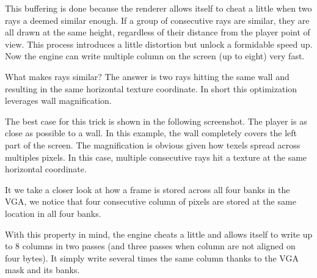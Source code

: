 \par
This buffering is done because the renderer allows itself to cheat a little when two rays a deemed similar enough. If a group of consecutive rays are similar, they are all drawn at the same height, regardless of their distance from the player point of view. This process introduces a little distortion but unlock a formidable speed up. Now the engine can write multiple column on the screen (up to eight) very fast.\\
\par
What makes rays similar? The answer is two rays hitting the same wall and resulting in the same  horizontal texture coordinate. In short this optimization leverages wall magnification.\\

\par
The best case for this trick is shown in the following screenshot. The player is as close as possible to a wall. In this example, the wall completely covers the left part of the screen. The magnification is obvious given how texels spread across multiples pixels. In this case, multiple consecutive rays hit a texture at the same horizontal coordinate.\\
\begin{figure}[H]
 \centering
\end{figure}
It we take a closer look at how a frame is stored across all four banks in the VGA, we notice that four consecutive column of pixels are stored at the same location in all four banks.\\
\par
With this property in mind, the engine cheats a little and allows itself to write up to 8 columns in two passes (and three passes when column are not aligned on four bytes). It simply write several times the same column thanks to the VGA mask and its banks.
 \par
  \begin{minipage}{\textwidth}
 
\centering
\vspace*{0.5cm}
\centering


 \end{minipage}

\par

